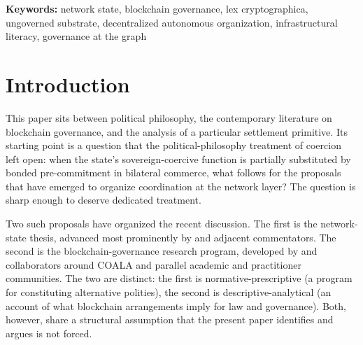 \documentclass[11pt,a4paper]{article}
\theoremstyle{remark}
\begin{document}
\begin{abstract}
The substantive claim of this paper is therefore not that
network-state or blockchain-governance programs are wrong on
their own terms ---- both are coherent research programs
addressing real questions ---- but that the architectural option
they presuppose away is the option the bonded primitive realizes.
Recognizing this option does not adjudicate among governed
arrangements; it relocates the governance question from the
substrate, where both programs place it, to the graph, where the
substrate admits it to be answered in arbitrarily many ways. That
relocation is the political-architectural content of the
substrate change with respect to network polity, and it is the
subject of this paper.
\end{abstract}

\medskip
\noindent\textbf{Keywords:}
network state, blockchain governance, lex cryptographica,
ungoverned substrate, decentralized autonomous organization,
infrastructural literacy, governance at the graph

\section{Introduction}
\label{sec:intro}

This paper sits between political philosophy, the contemporary
literature on blockchain governance, and the analysis of a
particular settlement primitive. Its starting point is a question
that the political-philosophy treatment of coercion left open:
when the state's sovereign-coercive function is partially
substituted by bonded pre-commitment in bilateral commerce, what
follows for the proposals that have emerged to organize
coordination at the network layer? The question is sharp enough
to deserve dedicated treatment.

Two such proposals have organized the recent discussion. The
first is the network-state thesis, advanced most prominently by
\citet{srinivasan2022network} and adjacent commentators. The
second is the blockchain-governance research program, developed
by \citet{defilippi_wright_2018} and collaborators around COALA
and parallel academic and practitioner communities. The two are
distinct: the first is normative-prescriptive (a program for
constituting alternative polities), the second is
descriptive-analytical (an account of what blockchain
arrangements imply for law and governance). Both, however, share
a structural assumption that the present paper identifies and
argues is not forced.
\end{document}
